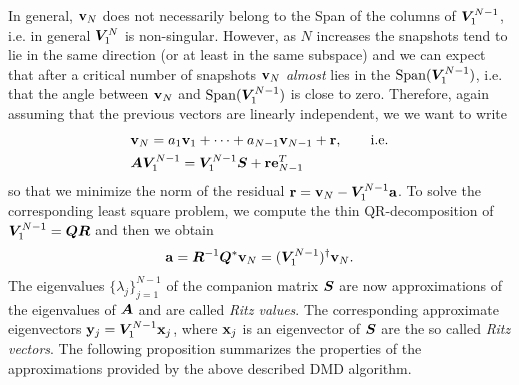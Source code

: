 In general, $\vb{v}_N$ does not necessarily belong to the Span of the columns of $\vb*{V}_1^{N-1}$, i.e. in general $\vb*{V}_1^{N}$ is non-singular. However, as $N$ increases the snapshots tend to lie in the same direction (or at least in the same subspace) and we can expect that after a critical number of snapshots $\vb{v}_N$ \emph{almost} lies in the $\mathrm{Span}{(\vb*{V}_1^{N-1})}$, i.e. that the angle between $\vb{v}_N$ and $\mathrm{Span}{(\vb*{V}_1^{N-1})}$ is close to zero. Therefore, again assuming that the previous vectors are linearly independent, we we want to write
\begin{equation}
    \label{vn_error}
    \begin{split}
        & \vb{v}_N = a_1 \vb{v}_1 + \dots + a_{N-1} \vb{v}_{N-1} + \vb{r}, \qquad \text{i.e.}\\
        & \vb*{A}\vb*{V}_1^{N-1}  = \vb*{V}_1^{N-1}\vb*{S} + \vb{r}\vb{e}_{N-1}^T
    \end{split}
\end{equation}
so that we minimize the norm of the residual $\vb{r} = \vb{v}_N - \vb*{V}_1^{N-1}\vb{a}$. To solve the corresponding least square problem, we compute the thin QR-decomposition of $\vb*{V}_1^{N-1} = \vb*{Q}\vb*{R}$ and then we obtain
\begin{equation}
    \label{a_qrleastsquare}
    \vb{a} = \vb*{R}^{-1} \vb*{Q}^*\vb{v}_N = (\vb*{V}_1^{N-1})^{\dagger}\vb{v}_N.
\end{equation}
The eigenvalues $\{\lambda_j\}_{j = 1}^{N-1}$ of the companion matrix $\vb*{S}$ are now approximations of the eigenvalues of $\vb*{A}$ and are called \emph{Ritz values}. The corresponding approximate eigenvectors $\vb{y}_j = \vb*{V}_1^{N-1}\vb{x}_j$, where $\vb{x}_j$ is an eigenvector of $\vb*{S}$ are the so called \emph{Ritz vectors}. The following proposition summarizes the properties of the approximations provided by the above described DMD algorithm.

